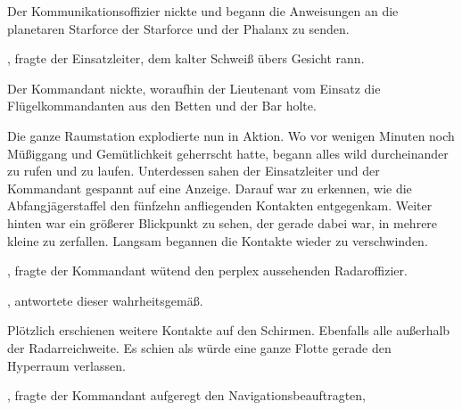 \par

Der Kommunikationsoffizier nickte und begann die Anweisungen an die planetaren Starforce der Starforce und der Phalanx zu senden.

\par

, fragte der Einsatzleiter, dem kalter Schweiß übers Gesicht rann.

\par

Der Kommandant nickte, woraufhin der Lieutenant vom Einsatz die Flügelkommandanten aus den Betten und der Bar holte.

\par

Die ganze Raumstation explodierte nun in Aktion. Wo vor wenigen Minuten noch Müßiggang und Gemütlichkeit geherrscht hatte, begann alles wild durcheinander zu rufen und zu laufen. Unterdessen sahen der Einsatzleiter und der Kommandant gespannt auf eine Anzeige. Darauf war zu erkennen, wie die Abfangjägerstaffel den fünfzehn anfliegenden Kontakten entgegenkam. Weiter hinten war ein größerer Blickpunkt zu sehen, der gerade dabei war, in mehrere kleine zu zerfallen. Langsam begannen die Kontakte wieder zu verschwinden.

\par

, fragte der Kommandant wütend den perplex aussehenden Radaroffizier.

\par

, antwortete dieser wahrheitsgemäß. 

\par

Plötzlich erschienen weitere Kontakte auf den Schirmen. Ebenfalls alle außerhalb der Radarreichweite. Es schien als würde eine ganze Flotte gerade den Hyperraum verlassen.

\par

, fragte der Kommandant aufgeregt den Navigationsbeauftragten, 

\par

